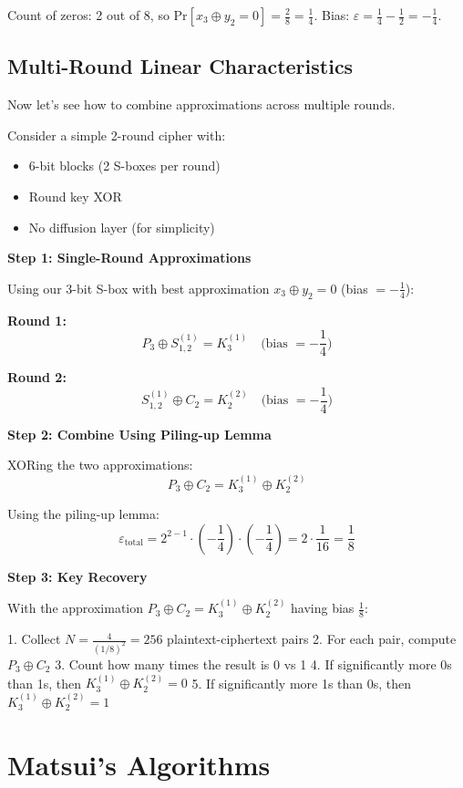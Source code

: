 \documentclass[12pt,a4paper]{article}
\newcommand{\bias}{\varepsilon}
\newcommand{\prob}[1]{\text{Pr}[#1]}
\newcommand{\xor}{\oplus}
\begin{document}
Count of zeros: 2 out of 8, so $\prob{x_3 \xor y_2 = 0} = \frac{2}{8} = \frac{1}{4}$.
Bias: $\bias = \frac{1}{4} - \frac{1}{2} = -\frac{1}{4}$.

\subsection{Multi-Round Linear Characteristics}

Now let's see how to combine approximations across multiple rounds.

\begin{examplebox}[title=2-Round Toy Cipher]
Consider a simple 2-round cipher with:
\begin{itemize}
    \item 6-bit blocks (2 S-boxes per round)
    \item Round key XOR
    \item No diffusion layer (for simplicity)
\end{itemize}
\end{examplebox}

\textbf{Step 1: Single-Round Approximations}

Using our 3-bit S-box with best approximation $x_3 \xor y_2 = 0$ (bias $= -\frac{1}{4}$):

\textbf{Round 1:}
$$P_3 \xor S_{1,2}^{(1)} = K_3^{(1)} \quad \text{(bias } = -\frac{1}{4}\text{)}$$

\textbf{Round 2:}
$$S_{1,2}^{(1)} \xor C_2 = K_2^{(2)} \quad \text{(bias } = -\frac{1}{4}\text{)}$$

\textbf{Step 2: Combine Using Piling-up Lemma}

XORing the two approximations:
$$P_3 \xor C_2 = K_3^{(1)} \xor K_2^{(2)}$$

Using the piling-up lemma:
$$\bias_{\text{total}} = 2^{2-1} \cdot \left(-\frac{1}{4}\right) \cdot \left(-\frac{1}{4}\right) = 2 \cdot \frac{1}{16} = \frac{1}{8}$$

\textbf{Step 3: Key Recovery}

With the approximation $P_3 \xor C_2 = K_3^{(1)} \xor K_2^{(2)}$ having bias $\frac{1}{8}$:

1. Collect $N = \frac{4}{(1/8)^2} = 256$ plaintext-ciphertext pairs
2. For each pair, compute $P_3 \xor C_2$
3. Count how many times the result is 0 vs 1
4. If significantly more 0s than 1s, then $K_3^{(1)} \xor K_2^{(2)} = 0$
5. If significantly more 1s than 0s, then $K_3^{(1)} \xor K_2^{(2)} = 1$

\section{Matsui's Algorithms}
\end{document}
